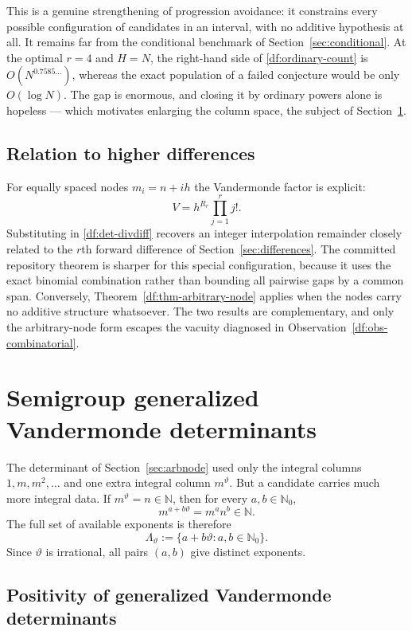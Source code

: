 \documentclass[11pt,oneside]{article}
\theoremstyle{definition}
\theoremstyle{remark}
\newcommand{\N}{\mathbb N}
\newcommand{\Nzero}{\mathbb N_0}
\newcommand{\thetaq}{\vartheta}
\newcommand{\LambdaTheta}{\Lambda_{\thetaq}}
\begin{document}
This is a genuine strengthening of progression avoidance: it constrains every possible
configuration of candidates in an interval, with no additive hypothesis at all.  It remains
far from the conditional benchmark of Section~\ref{sec:conditional}.  At the optimal $r=4$ and
$H=N$, the right-hand side of \eqref{df:ordinary-count} is $O(N^{0.7585\ldots})$, whereas the
exact population of a failed conjecture would be only $O(\log N)$.  The gap is enormous, and
closing it by ordinary powers alone is hopeless --- which motivates enlarging the column space,
the subject of Section~\ref{sec:semigroup}.

\subsection{Relation to higher differences}

For equally spaced nodes $m_i=n+ih$ the Vandermonde factor is explicit:
\[
 V=h^{R_r}\prod_{j=1}^{r}j! .
\]
Substituting in \eqref{df:det-divdiff} recovers an integer interpolation remainder closely
related to the $r$th forward difference of Section~\ref{sec:differences}.  The committed
repository theorem is sharper for this special configuration, because it uses the exact
binomial combination rather than bounding all pairwise gaps by a common span.  Conversely,
Theorem~\ref{df:thm-arbitrary-node} applies when the nodes carry no additive structure
whatsoever.  The two results are complementary, and only the arbitrary-node form escapes the
vacuity diagnosed in Observation~\ref{df:obs-combinatorial}.
\section{Semigroup generalized Vandermonde determinants}
\label{sec:semigroup}

The determinant of Section~\ref{sec:arbnode} used only the integral columns
$1,m,m^2,\ldots$ and one extra integral column $m^{\thetaq}$.  But a candidate carries much
more integral data.  If $m^{\thetaq}=n\in\N$, then for every $a,b\in\Nzero$,
\begin{equation}
 m^{a+b\thetaq}=m^a n^b\in\N.
 \label{sg:eq-mixed-integrality}
\end{equation}
The full set of available exponents is therefore
\[
 \LambdaTheta:=\{a+b\thetaq:a,b\in\Nzero\}.
\]
Since $\thetaq$ is irrational, all pairs $(a,b)$ give distinct exponents.

\subsection{Positivity of generalized Vandermonde determinants}
\end{document}
